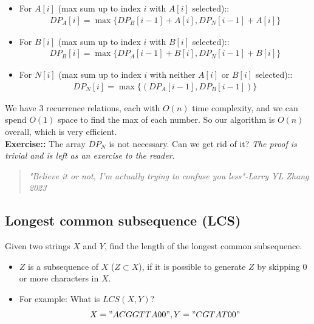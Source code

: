 \documentclass[12pt]{book}
\begin{document}
\begin{itemize}
    \item For $A[i]$ (max sum up to index $i$ with $A[i]$ selected)::
    \begin{align*}
        DP_A[i]=\max\{DP_B[i-1]+A[i],DP_N[i-1]+A[i]\}
    \end{align*}
    
    \item For $B[i]$ (max sum up to index $i$ with $B[i]$ selected)::
    \begin{align*}
        DP_B[i]=\max\{DP_A[i-1]+B[i],DP_N[i-1]+B[i]\}
    \end{align*}
    
    \item For $N[i]$ (max sum up to index $i$ with neither $A[i]$ or $B[i]$ selected)::
    \begin{align*}
        DP_N[i]=\max\{(DP_A[i-1], DP_B[i-1])\}
    \end{align*}
\end{itemize}

We have 3 recurrence relations, each with $O(n)$ time complexity, and we can spend $O(1)$ space to find the max of each number. So our algorithm is $O(n)$ overall, which is very efficient.\\

\textbf{Exercise::} The array $DP_N$ is not necessary. Can we get rid of it? \textit{The proof is trivial and is left as an exercise to the reader}.
\begin{quote}
    \textit{"Believe it or not, I'm actually trying to confuse you less"-Larry YL Zhang 2023}
\end{quote}

\subsection*{Longest common subsequence (LCS)}

Given two strings $X$ and $Y$, find the length of the longest common subsequence.

\begin{itemize}
    \item $Z$ is a subsequence of $X$ ($Z\subset X$), if it is possible to generate $Z$ by skipping 0 or more characters in $X$.
    \item For example: What is $LCS(X,Y)$?
    \begin{align*}
        X="ACGGTTA00",
        Y="CGTAT00"
    \end{align*}
\end{itemize}
\end{document}
